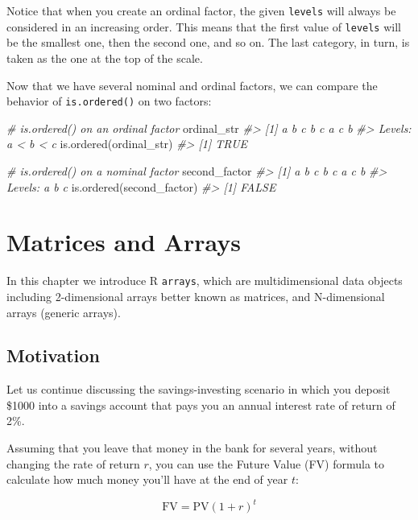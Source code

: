 \documentclass[
]{book}
\newenvironment{Shaded}{\begin{snugshade}}{\end{snugshade}}
\newcommand{\CommentTok}[1]{\textcolor[rgb]{0.56,0.35,0.01}{\textit{#1}}}
\newcommand{\FunctionTok}[1]{\textcolor[rgb]{0.00,0.00,0.00}{#1}}
\newcommand{\NormalTok}[1]{#1}
\begin{document}
Notice that when you create an ordinal factor, the given \texttt{levels} will always
be considered in an increasing order. This means that the first value of \texttt{levels}
will be the smallest one, then the second one, and so on. The last category,
in turn, is taken as the one at the top of the scale.

Now that we have several nominal and ordinal factors, we can compare the
behavior of \texttt{is.ordered()} on two factors:

\begin{Shaded}
\begin{Highlighting}[]
\CommentTok{\# is.ordered() on an ordinal factor}
\NormalTok{ordinal\_str}
\CommentTok{\#\textgreater{} [1] a b c b c a c b}
\CommentTok{\#\textgreater{} Levels: a \textless{} b \textless{} c}
\FunctionTok{is.ordered}\NormalTok{(ordinal\_str)}
\CommentTok{\#\textgreater{} [1] TRUE}

\CommentTok{\# is.ordered() on a nominal factor}
\NormalTok{second\_factor}
\CommentTok{\#\textgreater{} [1] a b c b c a c b}
\CommentTok{\#\textgreater{} Levels: a b c}
\FunctionTok{is.ordered}\NormalTok{(second\_factor)}
\CommentTok{\#\textgreater{} [1] FALSE}
\end{Highlighting}
\end{Shaded}

\hypertarget{arrays}{%
\chapter{Matrices and Arrays}\label{arrays}}

In this chapter we introduce R \texttt{arrays}, which are multidimensional
data objects including 2-dimensional arrays better known as matrices, and
N-dimensional arrays (generic arrays).

\hypertarget{motivation}{%
\section{Motivation}\label{motivation}}

Let us continue discussing the savings-investing scenario in which you deposit
\$1000 into a savings account that pays you an annual interest rate of return
of 2\%.

Assuming that you leave that money in the bank for several years, without
changing the rate of return \(r\), you can use the Future Value (FV) formula to
calculate how much money you'll have at the end of year \(t\):

\[
\text{FV} = \text{PV} (1 + r)^t
\]
\end{document}
